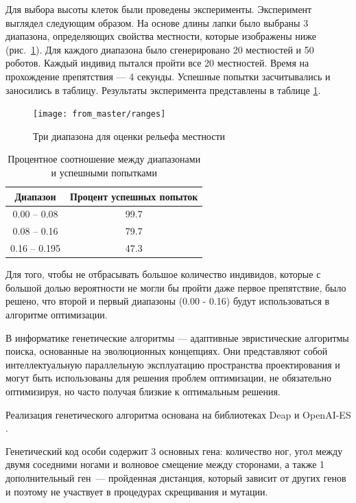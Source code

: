 Для выбора высоты клеток были проведены эксперименты. Эксперимент выглядел следующим образом. На основе длины лапки было выбраны 3 диапазона, определяющих свойства местности, которые изображены ниже (рис.~\ref{fig:range}). Для каждого диапазона было сгенерировано 20 местностей и 50 роботов. Каждый индивид пытался пройти все 20 местностей. Время на прохождение препятствия --- 4 секунды. Успешные попытки засчитывались и заносились в таблицу. Результаты эксперимента представлены в таблице \ref{tabular:ranges}.

\begin{figure}[H]
\centering\texttt{[image: from\_master/ranges]}\\
\caption{Три диапазона для оценки рельефа местности}
\label{fig:range}
\end{figure}


\begin{table}[H]
\caption{Процентное соотношение между диапазонами и успешными попытками}
\label{tabular:ranges}
\centering
\begin{tabular}{c|c}
 \textbf{Диапазон} & \textbf{Процент успешных попыток}\\
 \hline
0.00 -- 0.08 & 99.7 \\ 
0.08 -- 0.16 & 79.7 \\
0.16 -- 0.195 & 47.3 \\
\end{tabular}
\end{table}


Для того, чтобы не отбрасывать большое количество индивидов, которые с большой долью вероятности не могли бы пройти даже первое препятствие, было решено, что второй и первый диапазоны (0.00 - 0.16) будут использоваться в алгоритме оптимизации.

В информатике генетические алгоритмы --- адаптивные эвристические алгоритмы поиска, основанные на эволюционных концепциях. Они представляют собой интеллектуальную параллельную эксплуатацию пространства проектирования и могут быть использованы для решения проблем оптимизации, не обязательно оптимизируя, но часто получая близкие к оптимальным решения. 

Реализация генетического алгоритма основана на библиотеках Deap  и OpenAI-ES \cite{DEAP_JMLR2012,salimans_Evolution_2017}.

Генетический код особи содержит 3 основных гена: количество ног, угол между двумя соседними ногами и волновое смещение между сторонами, а также 1 дополнительный ген~--- пройденная дистанция, который зависит от других генов и поэтому не участвует в процедурах скрещивания и мутации. 

